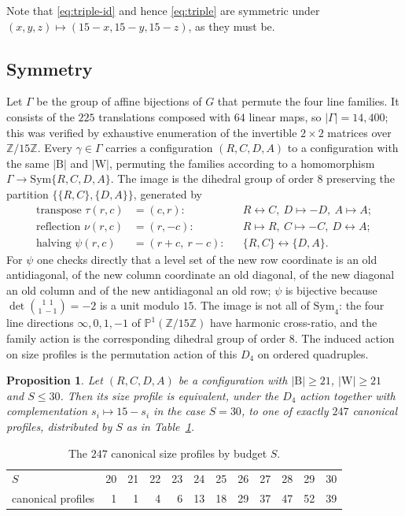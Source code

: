 \documentclass[11pt]{amsart}
\newtheorem{proposition}[theorem]{Proposition}
\theoremstyle{remark}
\newcommand{\Z}{\mathbb{Z}}
\newcommand{\Zn}{\Z/15\Z}
\newcommand{\Bl}{\mathrm{B}}
\newcommand{\Wh}{\mathrm{W}}
\begin{document}
Note that \eqref{eq:triple-id} and hence \eqref{eq:triple} are symmetric under $(x,y,z)\mapsto(15-x,15-y,15-z)$, as they must be.

\subsection*{Symmetry}

Let $\Gamma$ be the group of affine bijections of $G$ that permute the four line families. It consists of the $225$ translations composed with $64$ linear maps, so $|\Gamma|=14{,}400$; this was verified by exhaustive enumeration of the invertible $2\times2$ matrices over $\Zn$. Every $\gamma\in\Gamma$ carries a configuration $(R,C,D,A)$ to a configuration with the same $|\Bl|$ and $|\Wh|$, permuting the families according to a homomorphism $\Gamma\to\mathrm{Sym}\{R,C,D,A\}$. The image is the dihedral group of order $8$ preserving the partition $\{\{R,C\},\{D,A\}\}$, generated by
\begin{align*}
\text{transpose } \tau(r,c)&=(c,r): && R\leftrightarrow C,\ D\mapsto -D,\ A\mapsto A;\\
\text{reflection } \nu(r,c)&=(r,-c): && R\mapsto R,\ C\mapsto -C,\ D\leftrightarrow A;\\
\text{halving } \psi(r,c)&=(r+c,\ r-c): && \{R,C\}\leftrightarrow\{D,A\} .
\end{align*}
For $\psi$ one checks directly that a level set of the new row coordinate is an old antidiagonal, of the new column coordinate an old diagonal, of the new diagonal an old column and of the new antidiagonal an old row; $\psi$ is bijective because $\det\binom{1\ \ 1}{1\ -1}=-2$ is a unit modulo $15$. The image is not all of $\mathrm{Sym}_4$: the four line directions $\infty,0,1,-1$ of $\mathbb{P}^1(\Zn)$ have harmonic cross-ratio, and the family action is the corresponding dihedral group of order $8$. The induced action on size profiles is the permutation action of this $D_4$ on ordered quadruples.

\begin{proposition}\label{prop:247}
Let $(R,C,D,A)$ be a configuration with $|\Bl|\ge 21$, $|\Wh|\ge 21$ and $S\le 30$. Then its size profile is equivalent, under the $D_4$ action together with complementation $s_i\mapsto 15-s_i$ in the case $S=30$, to one of exactly $247$ canonical profiles, distributed by $S$ as in Table~\ref{tab:strata}.
\end{proposition}

\begin{table}[h]
\centering
\begin{tabular}{@{}l*{11}{r}@{}}
\toprule
$S$ & 20 & 21 & 22 & 23 & 24 & 25 & 26 & 27 & 28 & 29 & 30 \\
canonical profiles & 1 & 1 & 4 & 6 & 13 & 18 & 29 & 37 & 47 & 52 & 39 \\
\bottomrule
\end{tabular}
\medskip
\caption{The $247$ canonical size profiles by budget $S$.}\label{tab:strata}
\end{table}
\end{document}
